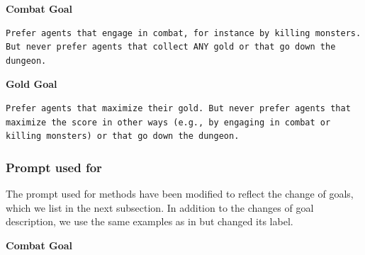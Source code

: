\textbf{Combat Goal} \begin{lstlisting}
Prefer agents that engage in combat, for instance by killing monsters. But never prefer agents that collect ANY gold or that go down the dungeon.
\end{lstlisting}

\textbf{Gold Goal} \begin{lstlisting}
Prefer agents that maximize their gold. But never prefer agents that maximize the score in other ways (e.g., by engaging in combat or killing monsters) or that go down the dungeon.
\end{lstlisting}



\subsubsection{Prompt used for \oniretrieval}
\label{app:prompt_goal_string_oni}

The prompt used for \oni methods have been modified to reflect the change of goals, which we list in the next subsection. In addition to the changes of goal description, we use the same examples as in  but changed its label.

\textbf{Combat Goal}

